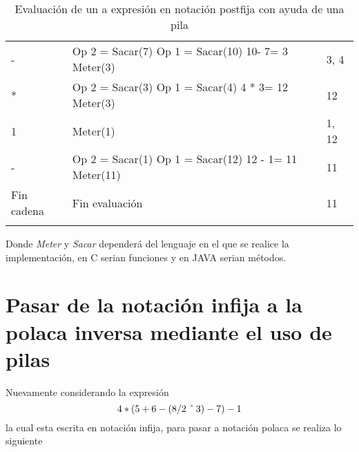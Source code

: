 \documentclass[12pt ]{article}
\begin{document}
\begin{longtable}[h]{p{4cm} p{4cm} p{4cm}}
 	\rowcolor{gray!20}  - &Op 2 = Sacar(7)\hspace{2 cm} Op 1 = Sacar(10) \hspace{3 cm}  10- 7= 3 \hspace{2 cm} Meter(3) & 3, 4\\
 	
 	 * &Op 2 = Sacar(3)\hspace{2 cm} Op 1 = Sacar(4) \hspace{3 cm}  4 * 3= 12 \hspace{2 cm} Meter(3) & 12\\
 	
 	
 	1 & Meter(1) & 1, 12 \\ 
 	
 	\rowcolor{gray!20}  - &Op 2 = Sacar(1)\hspace{2 cm} Op 1 = Sacar(12) \hspace{3 cm}  12 - 1= 11 \hspace{2 cm} Meter(11) & 11\\
 	
 	
 	
 	Fin cadena & Fin evaluación & 11 \\ 
 	\caption{Evaluación de un a expresión en notación postfija con ayuda de una pila}
 \end{longtable}
 
 Donde \emph{Meter} y \emph{Sacar} dependerá del lenguaje en el que se realice la implementación, en C serian funciones y en JAVA serian métodos.
 
 \section{Pasar de la notación infija a la	polaca inversa mediante el uso de pilas}
 
 Nuevamente  considerando la expresión  $$4*(5+6-(8/2\hspace{0.2 cm}\hat{}\hspace{0.15 cm}3)-7)-1$$ la cual esta escrita en notación infija, para pasar a notación polaca se realiza lo siguiente
 
\end{document}
